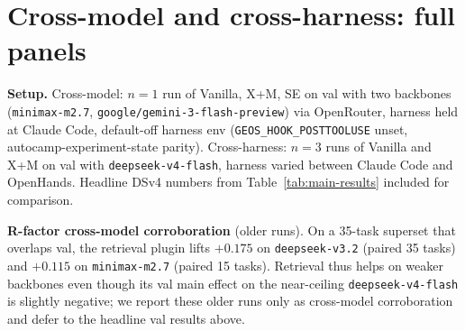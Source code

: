 \documentclass{article}
\begin{document}
\section{Cross-model and cross-harness: full panels}
\label{app:cross-model-detail}
\label{app:cross-model}

\textbf{Setup.} Cross-model: $n=1$ run of Vanilla, X+M, SE on val with two backbones (\texttt{minimax-m2.7}, \texttt{google/gemini-3-flash-preview}) via OpenRouter, harness held at Claude Code, default-off harness env (\texttt{GEOS\_HOOK\_POSTTOOLUSE} unset, autocamp-experiment-state parity). Cross-harness: $n=3$ runs of Vanilla and X+M on val with \texttt{deepseek-v4-flash}, harness varied between Claude Code and OpenHands. Headline DSv4 numbers from Table~\ref{tab:main-results} included for comparison.

\begin{table}[h]
  \caption{Full cross-model and cross-harness panel. Counts in parentheses are task failures out of 17.}
  \label{tab:cross-cutting-full}
  \centering
  \small
\end{table}

\textbf{R-factor cross-model corroboration} (older runs). On a 35-task superset that overlaps val, the retrieval plugin lifts $+0.175$ on \texttt{deepseek-v3.2} (paired 35 tasks) and $+0.115$ on \texttt{minimax-m2.7} (paired 15 tasks). Retrieval thus helps on weaker backbones even though its val main effect on the near-ceiling \texttt{deepseek-v4-flash} is slightly negative; we report these older runs only as cross-model corroboration and defer to the headline val results above.
\end{document}
